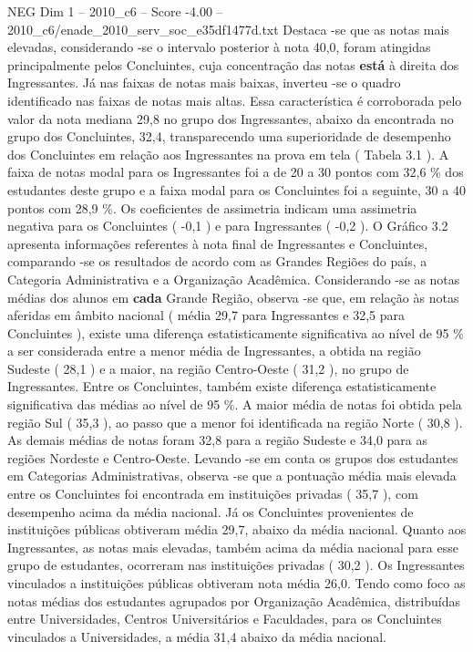 \begin{textsample}{NEG Dim 1 – 2010\_c6 – Score -4.00 – 2010\_c6/enade\_2010\_serv\_soc\_e35df1477d.txt}
Destaca -se que as notas mais elevadas, considerando -se o intervalo posterior à nota 40,0, foram atingidas principalmente pelos Concluintes, cuja concentração das notas \textbf{está} à direita dos Ingressantes.
Já nas faixas de notas mais baixas, inverteu -se o quadro identificado nas faixas de notas mais altas.
Essa característica é corroborada pelo valor da nota mediana 29,8 no grupo dos Ingressantes, abaixo da encontrada no grupo dos Concluintes, 32,4, transparecendo uma superioridade de desempenho dos Concluintes em relação aos Ingressantes na prova em tela ( Tabela 3.1 ).
A faixa de notas modal para os Ingressantes foi a de 20 a 30 pontos com 32,6 \% dos estudantes deste grupo e a faixa modal para os Concluintes foi a seguinte, 30 a 40 pontos com 28,9 \%.
Os coeficientes de assimetria indicam uma assimetria negativa para os Concluintes ( -0,1 ) e para Ingressantes ( -0,2 ).
O Gráfico 3.2 apresenta informações referentes à nota final de Ingressantes e Concluintes, comparando -se os resultados de acordo com as Grandes Regiões do país, a Categoria Administrativa e a Organização Acadêmica.
Considerando -se as notas médias dos alunos em \textbf{cada} Grande Região, observa -se que, em relação às notas aferidas em âmbito nacional ( média 29,7 para Ingressantes e 32,5 para Concluintes ), existe uma diferença estatisticamente significativa ao nível de 95 \% a ser considerada entre a menor média de Ingressantes, a obtida na região Sudeste ( 28,1 ) e a maior, na região Centro-Oeste ( 31,2 ), no grupo de Ingressantes.
Entre os Concluintes, também existe diferença estatisticamente significativa das médias ao nível de 95 \%.
A maior média de notas foi obtida pela região Sul ( 35,3 ), ao passo que a menor foi identificada na região Norte ( 30,8 ).
As demais médias de notas foram 32,8 para a região Sudeste e 34,0 para as regiões Nordeste e Centro-Oeste.
Levando -se em conta os grupos dos estudantes em Categorias Administrativas, observa -se que a pontuação média mais elevada entre os Concluintes foi encontrada em instituições privadas ( 35,7 ), com desempenho acima da média nacional.
Já os Concluintes provenientes de instituições públicas obtiveram média 29,7, abaixo da média nacional.
Quanto aos Ingressantes, as notas mais elevadas, também acima da média nacional para esse grupo de estudantes, ocorreram nas instituições privadas ( 30,2 ).
Os Ingressantes vinculados a instituições públicas obtiveram nota média 26,0.
Tendo como foco as notas médias dos estudantes agrupados por Organização Acadêmica, distribuídas entre Universidades, Centros Universitários e Faculdades, para os Concluintes vinculados a Universidades, a média 31,4 abaixo da média nacional.

\end{textsample}
